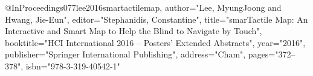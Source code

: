 @InProceedings{077lee2016smartactilemap,
author="Lee, MyungJoong
and Hwang, Jie-Eun",
editor="Stephanidis, Constantine",
title="smarTactile Map: An Interactive and Smart Map to Help the Blind to Navigate by Touch",
booktitle="HCI International 2016 -- Posters' Extended Abstracts",
year="2016",
publisher="Springer International Publishing",
address="Cham",
pages="372--378",
isbn="978-3-319-40542-1"
}